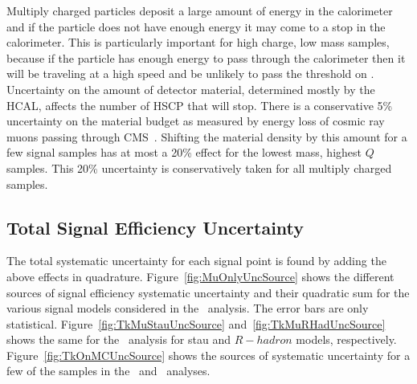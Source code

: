 Multiply charged particles deposit a large amount of energy in the calorimeter and if the particle does not have enough energy it may come to a stop in the calorimeter.
This is particularly important for high charge, low mass samples, because if the particle has enough energy to pass through the calorimeter then it will
be traveling at a high speed and be unlikely to pass the threshold on \invbeta. Uncertainty on the amount of detector material, determined mostly by the
HCAL, affects the number of HSCP that will stop. There is a conservative 5\% uncertainty on the material budget as measured by energy loss of cosmic ray muons
passing through CMS~\cite{2010JInst...5T3021C}. Shifting the material density by this amount for a few signal samples has at most a 20\% effect
for the lowest mass, highest $Q$ samples. This 20\% uncertainty is conservatively taken for all multiply charged samples.

\subsection{Total Signal Efficiency Uncertainty}

The total systematic uncertainty for each signal point is found by adding the above effects in quadrature.
Figure~\ref{fig:MuOnlyUncSource} shows the different sources of signal efficiency systematic uncertainty and their quadratic sum
for the various signal models considered in the \muononly\ analysis. The error bars are only statistical.
Figure~\ref{fig:TkMuStauUncSource} and~\ref{fig:TkMuRHadUncSource} shows the same for the \tktof\ analysis for stau and $R-hadron$ models, respectively.
Figure~\ref{fig:TkOnMCUncSource} shows the sources of systematic uncertainty for a few of the samples in the \tkonly\ and \multi\ analyses.

